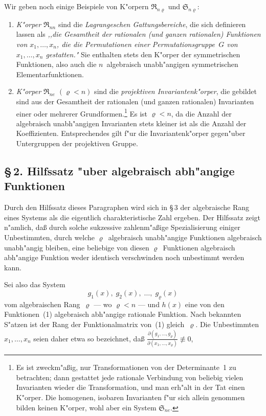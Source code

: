 \documentclass[11pt,a4paper]{article}
\begin{document}
Wir geben noch einige Beispiele von K"{o}rpern $\mathfrak{R}_{n\varrho}$ und $\mathfrak{S}_{n\varrho}$:
\begin{enumerate}
\item \emph{K"{o}rper $\mathfrak{R}_{nn}$} sind die \emph{Lagrangeschen Gattungsbereiche}, die sich
definieren lassen als \emph{,,die Gesamtheit der rationalen (und ganzen rationalen)
Funktionen von $x_{1},\dots,x_{n}$, die die Permutationen einer Permutationsgruppe~$G$
von $x_{1},\dots,x_{n}$ gestatten."{}} Sie enthalten stets den K"{o}rper der symmetrischen
Funktionen, also auch die $n$~algebraisch unabh"{a}ngigen symmetrischen
Elementarfunktionen.

\item \emph{K"{o}rper $\mathfrak{R}_{ne}$ $(\varrho<n)$} sind die \emph{projektiven Invariantenk"{o}rper},
die gebildet sind aus der Gesamtheit der rationalen (und ganzen rationalen)
Invarianten einer oder mehrerer Grundformen.\footnote{Es ist zweckm"{a}\ss{}ig,
nur Transformationen von der Determinante~1 zu betrachten; dann gestattet
jede rationale Verbindung von beliebig vielen Invarianten wieder die
Transformation, und man erh"{a}lt in der Tat einen K"{o}rper. Die homogenen,
isobaren Invarianten f"{u}r sich allein genommen bilden keinen K"{o}rper, wohl
aber ein System $\mathfrak{S}_{ne}$.} Es ist $\varrho<n$, da die Anzahl der algebraisch
unabh"{a}ngigen Invarianten stets kleiner ist als die Anzahl der Koeffizienten.
Entsprechendes gilt f"{u}r die Invariantenk"{o}rper gegen"{u}ber Untergruppen
der projektiven Gruppe.
\end{enumerate}

\subsection*{\S\,2. Hilfssatz "{u}ber algebraisch abh"{a}ngige Funktionen}

Durch den Hilfssatz dieses Paragraphen wird sich in \S\,3 der algebraische
Rang eines Systems als die eigentlich charakteristische Zahl ergeben.
Der Hilfssatz zeigt n"{a}mlich, da\ss{} durch solche sukzessive zahlenm"{a}\ss{}ige
Spezialisierung einiger Unbestimmten, durch welche $\varrho$~algebraisch
unabh"{a}ngige Funktionen algebraisch unabh"{a}ngig bleiben, eine beliebige
von diesen $\varrho$~Funktionen algebraisch abh"{a}ngige Funktion weder identisch
verschwinden noch unbestimmt werden kann.

Sei also das System
\begin{equation}
g_{1}(x),\;g_{2}(x),\;\dots,\;g_{\varrho}(x)
\tag{1}
\end{equation}
vom algebraischen Rang~$\varrho$ --- wo $\varrho<n$ --- und $h(x)$ eine von den Funktionen~(1)
algebraisch abh"{a}ngige rationale Funktion. Nach bekannten S"{a}tzen
ist der Rang der Funktionalmatrix von~(1) gleich~$\varrho$. Die Unbestimmten
$x_{1},\dots,x_{n}$ seien daher etwa so bezeichnet, da\ss{} $\frac{\partial(g_{1},\dots,g_{\varrho})}{\partial(x_{1},\dots,x_{\varrho})}\not\equiv 0$,
\end{document}
